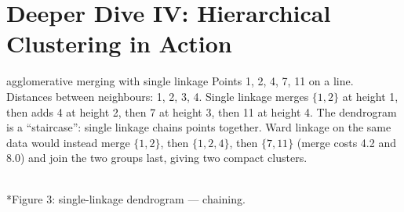 \documentclass[11pt]{article}
\begin{document}
\section{Deeper Dive IV: Hierarchical Clustering in Action}
\begin{example}{agglomerative merging with single linkage}
Points 1, 2, 4, 7, 11 on a line. Distances between neighbours: 1, 2, 3, 4. Single linkage merges $\{1,2\}$ at height 1, then adds 4 at height 2, then 7 at height 3, then 11 at height 4. The dendrogram is a ``staircase'': single linkage chains points together. Ward linkage on the same data would instead merge $\{1,2\}$, then $\{1,2,4\}$, then $\{7,11\}$ (merge costs 4.2 and 8.0) and join the two groups last, giving two compact clusters.
\end{example}
\begin{center}\\*{\small\color{GreyN}Figure 3: single-linkage dendrogram --- chaining.}\end{center}
\end{document}
